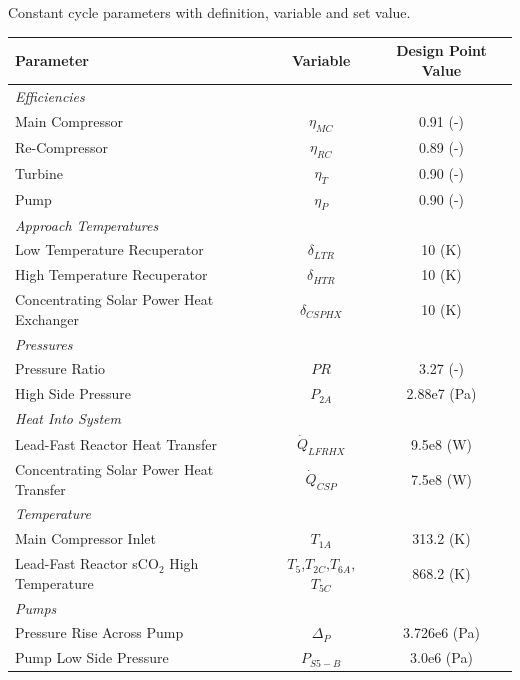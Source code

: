 \begin{paracol}{2}
\begin{specialtable}[H] 
    \caption{Constant cycle parameters with definition, variable and set value. \label{cycle-constants}}
    \begin{tabular}{lcc}
    \toprule
    \textbf{Parameter} & \textbf{Variable}	& \textbf{Design Point Value}\\
    \midrule
    \textit{Efficiencies}\\
    Main Compressor & $\eta_{MC}$		& 0.91 (-)\\
    Re-Compressor & $\eta_{RC}$		& 0.89 (-)\\
    Turbine & $\eta_{T}$		& 0.90 (-)\\
    Pump & $\eta_{P}$      & 0.90 (-)\\
    \midrule
    \textit{Approach Temperatures}\\
    Low Temperature Recuperator & $\delta_{LTR}$		& 10 (K)\\
    High Temperature Recuperator & $\delta_{HTR}$		& 10 (K)\\
    Concentrating Solar Power Heat Exchanger & $\delta_{CSPHX}$	& 10 (K)\\
    \midrule
    \textit{Pressures}\\
    Pressure Ratio & $PR$ & 3.27 (-)\\
    High Side Pressure & $P_{2A}$ & 2.88e7 (Pa)\\
    \midrule
    \textit{Heat Into System}\\
    Lead-Fast Reactor Heat Transfer & $\dot{Q}_{LFRHX}$ & 9.5e8 (W)\\
    Concentrating Solar Power Heat Transfer & $\dot{Q}_{CSP}$ & 7.5e8 (W)\\
    \midrule
    \textit{Temperature}\\
    Main Compressor Inlet & $T_{1A}$ & 313.2 (K)\\
    Lead-Fast Reactor sCO$_{2}$ High Temperature & $T_{5}$,$T_{2C}$,$T_{6A}$,$T_{5C}$ & 868.2 (K)\\
    \midrule
    \textit{Pumps}\\
    Pressure Rise Across Pump & $\Delta_{P}$ & 3.726e6 (Pa)\\
    Pump Low Side Pressure & $P_{S5-B}$ & 3.0e6 (Pa)\\ 
    \bottomrule
    \end{tabular}
\end{specialtable}


\end{paracol}
